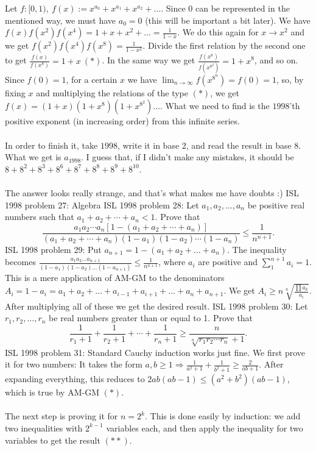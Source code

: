 Let $f:[0,1),\ f(x):=x^{a_0}+x^{a_1}+x^{a_2}+\ldots$. Since $0$ can be represented in the mentioned way, we must have $a_0=0$ (this will be important a bit later). We have $f(x)f(x^2)f(x^4)=1+x+x^2+\ldots=\frac 1{1-x}$. We do this again for $x\to x^2$ and we get $f(x^2)f(x^4)f(x^8)=\frac 1{1-x^2}$. Divide the first relation by the second one to get $\frac {f(x)}{f(x^8)}=1+x\ (*)$. In the same way we get $\frac{f(x^8)}{f(x^{8^2})}=1+x^8$, and so on. Since $f(0)=1$, for a certain $x$ we have $\lim_{n\to\infty}f(x^{8^n})=f(0)=1$, so, by fixing $x$ and multiplying the relations of the type $(*)$, we get $f(x)=(1+x)(1+x^8)(1+x^{8^2})\ldots$. What we need to find is the $1998$'th positive exponent (in increasing order) from this infinite series. \\\\
In order to finish it, take $1998$, write it in base $2$, and read the result in base $8$. What we get is $a_{1998}$. I guess that, if I didn't make any mistakes, it should be $8+8^2+8^3+8^6+8^7+8^8+8^9+8^{10}$. \\\\
The answer looks really strange, and that's what makes me have doubts :) 
ISL 1998 problem 27:  Algebra 
ISL 1998 problem 28:  Let $a_1,a_2,\ldots ,a_n$ be positive real numbers such that $a_1+a_2+\cdots +a_n<1$. Prove that
\[
\frac{a_1 a_2 \cdots a_n \left[ 1 - (a_1 + a_2 + \cdots + a_n) \right] }{(a_1 + a_2 + \cdots + a_n)( 1 - a_1)(1 - a_2) \cdots (1 - a_n)} \leq \frac{1}{ n^{n+1}}.
\] 
ISL 1998 problem 29:  Put $a_{n+1}=1-(a_1+a_2+\ldots+a_n)$. The inequality becomes $\frac{a_1a_2\ldots a_{n+1}}{(1-a_1)(1-a_2)\ldots (1-a_{n+1})}\le \frac 1{n^{n+1}}$, where $a_i$ are positive and $\sum_1^{n+1}a_i=1$. This is a mere application of AM-GM to the denominators $A_i=1-a_i=a_1+a_2+\ldots+a_{i-1}+a_{i+1}+\ldots+a_n+a_{n+1}$. We get $A_i\ge n\sqrt[n]{\frac{\prod a_k}{a_i}}$. After multiplying all of these we get the desired result. 
ISL 1998 problem 30:  Let $r_1,r_2,\ldots ,r_n$ be real numbers greater than or equal to 1. Prove that
\[
\frac{1}{r_1 + 1} + \frac{1}{r_2 + 1} + \cdots +\frac{1}{r_n+1} \geq \frac{n}{ \sqrt[n]{r_1r_2 \cdots r_n}+1}.
\] 
ISL 1998 problem 31:  Standard Cauchy induction works just fine. We first prove it for two numbers: It takes the form $a,b\ge 1\Rightarrow \frac 1{a^2+1}+\frac 1{b^2+1}\ge \frac 2{ab+1}$. After expanding everything, this reduces to $2ab(ab-1)\le (a^2+b^2)(ab-1)$, which is true by AM-GM $(*)$. \\\\
The next step is proving it for $n=2^k$. This is done easily by induction: we add two inequalities with $2^{k-1}$ variables each, and then apply the inequality for two variables to get the result $(**)$. \\\\
